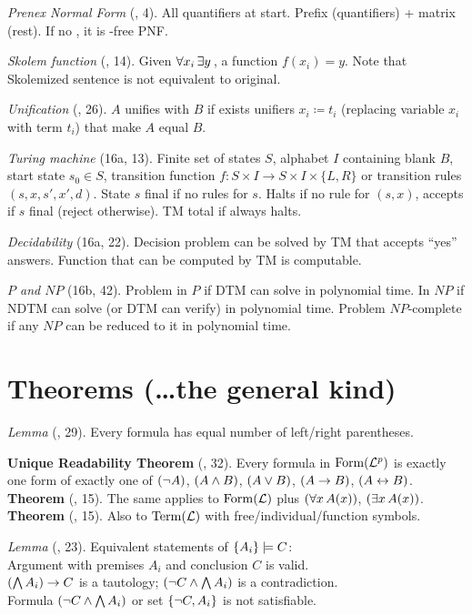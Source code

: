 \documentclass[class=cs245,nogeometry]{agony}
\newcommand{\dfn}[3]{\textit{#1} (\textsection #2, #3).}
\newcommand{\thm}[3][Theorem]{\textbf{#1} (\textsection #2, #3).}
\newcommand{\lem}[2]{\textit{Lemma} (\textsection #1, #2).}
\begin{document}
\begin{multicols}{2}
  \dfn{Prenex Normal Form}{15}{4}
  All quantifiers at start.
  Prefix (quantifiers) + matrix (rest).
  If no \X{}, it is \X{}-free PNF.

  \dfn{Skolem function}{15}{14}
  Given $\A[x_i]\X[y]$, a function $f(x_i) = y$.
  Note that Skolemized sentence is not equivalent to original.

  \dfn{Unification}{15}{26}
  $A$ unifies with $B$ if exists unifiers $x_i \coloneqq t_i$
  (replacing variable $x_i$ with term $t_i$) that make $A$ equal $B$.

  \dfn{Turing machine}{16a}{13}
  Finite set of states $S$, alphabet $I$ containing blank $B$,
  start state $s_0 \in S$,
  transition function $f : S \times I \to S \times I \times \{L,R\}$ or
  transition rules $(s,x,s',x',d)$.
  State $s$ final if no rules for $s$.
  Halts if no rule for $(s,x)$, accepts if $s$ final (reject otherwise).
  TM total if always halts.

  \dfn{Decidability}{16a}{22}
  Decision problem can be solved by TM that accepts ``yes'' answers.
  Function that can be computed by TM is computable.

  \dfn{$P$ and $NP$}{16b}{42}
  Problem in $P$ if DTM can solve in polynomial time.
  In $NP$ if NDTM can solve (or DTM can verify) in polynomial time.
  Problem $NP$-complete if any $NP$ can be reduced to it in polynomial time.


  \section*{Theorems (\ldots{}the general kind)}

  \lem{02}{29} Every formula has equal number of left/right parentheses.

  \thm[Unique Readability Theorem]{02}{32}
  Every formula in $\Form(\Lp)$ is exactly one form of exactly one of
  $(\n A)$, $(A \a B)$, $(A \o B)$, $(A \i B)$, $(A \e B)$. \\
  \thm{11}{15} The same applies to $\Form(\L)$ plus $(\A[x] A(x))$, $(\X[x] A(x))$.
  \thm{11}{15} Also to $\Term(\L)$ with free/individual/function symbols.

  \lem{03}{23} Equivalent statements of $\{A_i\} \t C$: \\
  Argument with premises $A_i$ and conclusion $C$ is valid.\\
  $(\bigwedge A_i) \i C$ is a tautology;
  $(\n C \a \bigwedge A_i)$ is a contradiction. \\
  Formula $(\n C \a \bigwedge A_i)$ or set $\{\n C, A_i\}$ is not satisfiable.


\end{multicols}
\end{document}
